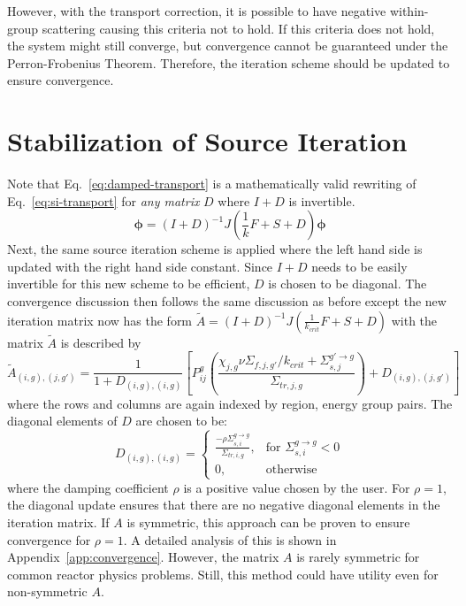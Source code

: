 However, with the transport correction, it is possible to have negative within-group scattering causing this criteria not to hold. If this criteria does not hold, the system might still converge, but convergence cannot be guaranteed under the Perron-Frobenius Theorem. Therefore, the iteration scheme should be updated to ensure convergence. 

\section{Stabilization of Source Iteration}
\label{sec:diagonal-stabilization}

Note that Eq.~\ref{eq:damped-transport} is a mathematically valid rewriting of Eq.~\ref{eq:si-transport} for \textit{any matrix} $D$ where $I+D$ is invertible. 
\begin{equation}
	\boldsymbol{\phi} = (I+D)^{-1} J \left(\frac{1}{k} F + S + D\right) \boldsymbol{\phi}
	\label{eq:damped-transport}
\end{equation}
Next, the same source iteration scheme is applied where the left hand side is updated with the right hand side constant. Since $I+D$ needs to be easily invertible for this new scheme to be efficient, $D$ is chosen to be diagonal. The convergence discussion then follows the same discussion as before except the new iteration matrix  now has the form $\tilde{A} = (I+D)^{-1} J \left(\frac{1}{k_{\textit{crit}}} F + S + D\right)$  with the matrix $\tilde{A}$ is described by
\begin{equation}
	\tilde{A}_{(i,g), (j, g')} = \frac{1}{1 + D_{(i,g), (i,g)}}\left[P_{ij}^g \left(\frac{\chi_{j,g} \nu\Sigma_{f,j,g'} / k_{\textit{crit}} + \Sigma_{s,j}^{g' \rightarrow g}}{\Sigma_{\textit{tr}, j, g}}\right) + D_{(i,g), (j, g')}\right]
	\label{eq:a-tilde}
\end{equation}
where the rows and columns are again indexed by region, energy group pairs. The diagonal elements of $D$ are chosen to be:
\begin{equation}
	D_{(i,g), (i,g)} = \left\{\begin{array}{lr}
		\frac{-\rho \Sigma_{s,i}^{g \rightarrow g}}{\Sigma_{\textit{tr}, i, g}} , & \text{for } \Sigma_{s,i}^{g \rightarrow g} < 0\\
		0, & \text{otherwise}
	\end{array}\right.
	\label{eq:d-matrix}
\end{equation}
where the damping coefficient $\rho$ is a positive value chosen by the user. For $\rho = 1$, the diagonal update ensures that there are no negative diagonal elements in the iteration matrix. If $A$ is symmetric, this approach can be proven to ensure convergence for $\rho=1$. A detailed analysis of this is shown in Appendix~\ref{app:convergence}. However, the matrix $A$ is rarely symmetric for common reactor physics problems. Still, this method could have utility even for non-symmetric $A$.


